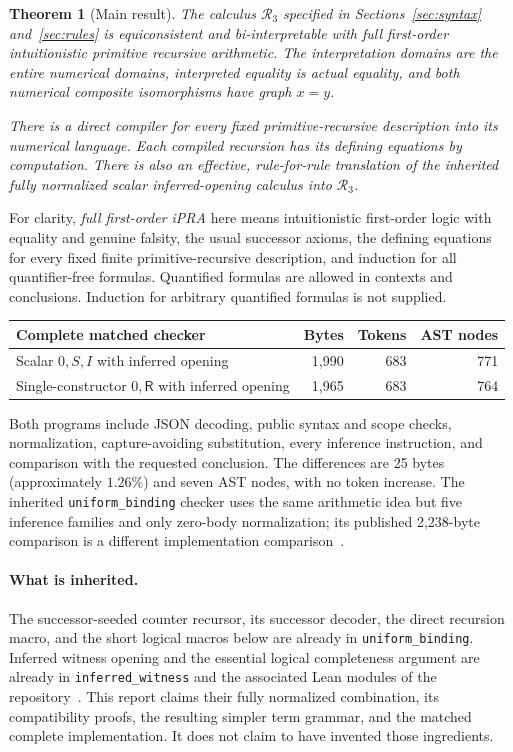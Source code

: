 \documentclass[11pt]{article}
\newtheorem{theorem}{Theorem}[section]
\theoremstyle{definition}
\theoremstyle{remark}
\newcommand{\R}{\mathsf R}
\newcommand{\K}{\mathcal R_3}
\begin{document}
\begin{theorem}[Main result]
\label{thm:main}
The calculus $\K$ specified in Sections~\ref{sec:syntax}
and~\ref{sec:rules} is equiconsistent and bi-interpretable with full
first-order intuitionistic primitive recursive arithmetic. The
interpretation domains are the entire numerical domains, interpreted
equality is actual equality, and both numerical composite
isomorphisms have graph $x=y$.

There is a direct compiler for every fixed primitive-recursive
description into its numerical language. Each compiled recursion
has its defining equations by computation. There is also an
effective, rule-for-rule translation of the inherited fully normalized
scalar inferred-opening calculus into $\K$.
\end{theorem}

For clarity, \emph{full first-order iPRA} here means intuitionistic
first-order logic with equality and genuine falsity, the usual
successor axioms, the defining equations for every fixed finite
primitive-recursive description, and induction for all
quantifier-free formulas. Quantified formulas are allowed in
contexts and conclusions. Induction for arbitrary quantified
formulas is not supplied.

\begin{center}
\begin{tabular}{@{}lrrr@{}}
\toprule
Complete matched checker & Bytes & Tokens & AST nodes\\
\midrule
Scalar $0,S,I$ with inferred opening & 1,990 & 683 & 771\\
Single-constructor $0,\R$ with inferred opening & 1,965 & 683 & 764\\
\bottomrule
\end{tabular}
\end{center}

Both programs include JSON decoding, public syntax and scope checks,
normalization, capture-avoiding substitution, every inference
instruction, and comparison with the requested conclusion.
The differences are 25 bytes (approximately $1.26\%$) and seven AST
nodes, with no token increase. The inherited
\texttt{uniform\_binding} checker uses the same arithmetic idea but
five inference families and only zero-body normalization; its
published 2,238-byte comparison is a different implementation
comparison~\cite{uniform}.

\paragraph{What is inherited.}
The successor-seeded counter recursor, its successor decoder, the
direct recursion macro, and the short logical macros below are
already in \texttt{uniform\_binding}. Inferred witness opening and
the essential logical completeness argument are already in
\texttt{inferred\_witness} and the associated Lean modules
of the repository~\cite{inferred,lean}. This report claims their
fully normalized combination, its compatibility proofs, the
resulting simpler term grammar, and the matched complete
implementation. It does not claim to have invented those ingredients.
\end{document}
